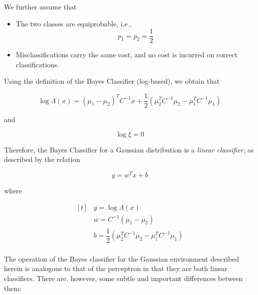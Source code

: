 \documentclass[twocolumn]{article}
\begin{document}
		 We further assume that

		 \begin{itemize}
			 \item The two classes are equiprobable, i.e.,
			       $$ p_{1} = p_{2} = \dfrac{1}{2} $$
			 \item Misclassifications carry the same cost, and no cost is incurred on correct classifications.
		 \end{itemize}

		 Using the definition of the Bayes Classifier (log-based), we obtain that

		 $$ \log \Lambda (x) = (\mu_{1} - \mu_{2})^{T} C^{-1} x + \dfrac{1}{2} (\mu_{2}^{T} C^{-1} \mu_{2} - \mu^{T}_{1} C^{-1}\mu_{1}) $$

		 \noindent and

		 $$ \log \xi = 0 $$

		 Therefore, the Bayes Classifier for a Gaussian distribution is a \textit{linear classifier}, as described by the relation

		 $$ y = w^{T}x + b $$

		 \noindent where

		 $$ \begin{aligned}[t]
				  & y = \log \Lambda (x)                                                      \\
				  & w = C^{-1} (\mu_{1} - \mu_{2})                                            \\
				  & b = \dfrac{1}{2} (\mu_{2}^{T} C^{-1} \mu_{2} - \mu_{1}^{T} C^{-1}\mu_{1}) \\
			 \end{aligned} $$

		 The operation of the Bayes classifier for the Gaussian environment described herein is analogous to that of the perceptron in that they are both linear classifiers. There are, however, some subtle and important differences between them:
\end{document}
